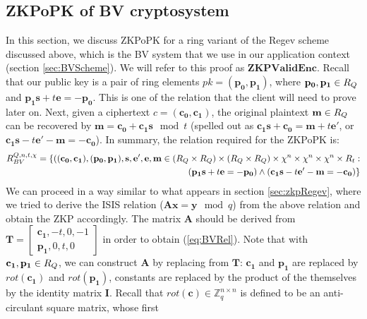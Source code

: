 \subsection{ZKPoPK of BV cryptosystem}
\label{sec:ZKPBV}
In this section, we discuss ZKPoPK for a ring variant of the Regev scheme discussed above, which is the BV system that we use in
our application context (section \ref{sec:BVScheme}). We will refer to this
proof as $\mathbf{ZKPValidEnc}$. Recall that our public key is a pair of ring elements $pk = (\mathbf{p_0},
\mathbf{p_1})$, where $\mathbf{p_0}, \mathbf{p_1} \in R_Q$ and $\mathbf{p_1}\mathbf{s}+ t\mathbf{e} = -\mathbf{p_0} $. This
is one of the relation that the client will need to prove later on. Next, given a ciphertext $c = (\mathbf{c_0}, \mathbf{c_1})$, the original
plaintext $\mathbf{m} \in R_Q$ can be recovered by $\mathbf{m} = \mathbf{c_0} + \mathbf{c_1}\mathbf{s} \mod t$ (spelled out as $\mathbf{c_1}\mathbf{s} + \mathbf{c_0} = \mathbf{m} + t\mathbf{e'}$, or $\mathbf{c_1}\mathbf{s} -t\mathbf{e'} -\mathbf{m} = -\mathbf{c_0}$).
In summary, the relation required for the ZKPoPK is:
\begin{align}
  \label{eq:BVRel}
  R_{BV}^{Q,n,t,\chi} = \{((\mathbf{c_0}, \mathbf{c_1}),(\mathbf{p_0}, \mathbf{p_1}), \mathbf{s},\mathbf{e'}, \mathbf{e}, \mathbf{m} \in
  (R_Q \times R_Q) \times (R_Q \times R_Q)  \times \chi^n \times \chi^n \times \chi^n \times R_t:\\ \nonumber
  (\mathbf{p_1}\mathbf{s} + t\mathbf{e} = -\mathbf{p_0} ) \land (\mathbf{c_1}\mathbf{s} - t\mathbf{e'} -\mathbf{m} = -\mathbf{c_0})
  \}
\end{align}
We can proceed in a way similar to what appears in section \ref{sec:zkpRegev}, where we tried to derive the ISIS relation ($\mathbf{A}\mathbf{x} = \mathbf{y} \mod q$)
from the above relation and obtain the ZKP accordingly.
The matrix $\mathbf{A}$ should be derived from $\mathbf{T}= \begin{bmatrix}
  \mathbf{c_1}, -t, 0, -1\\ \mathbf{p_1}, 0, t, 0
\end{bmatrix}$ in order to obtain (\ref{eq:BVRel}). Note that with $\mathbf{c_1},\mathbf{p_1} \in R_Q$, we can construct $\mathbf{A}$ by
replacing from $\mathbf{T}$: $\mathbf{c_1}$ and $\mathbf{p_1}$ are replaced by $rot(\mathbf{c_1})$ and $rot(\mathbf{p_1})$, constants
are replaced by the product of the themselves by the identity matrix $\mathbf{I}$. Recall that $ rot({\textbf{c}}) \in
\mathbb{Z}_q^{n\times n}$ is defined to be an anti-circulant
square matrix, whose first
